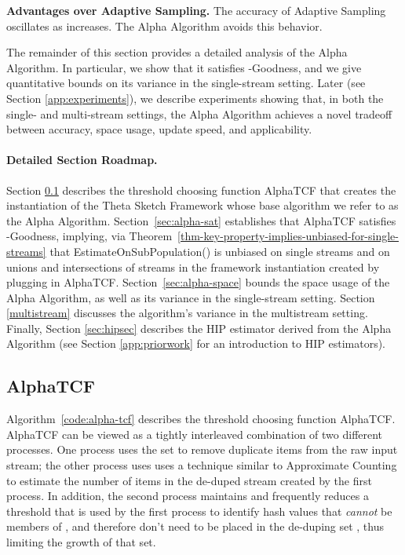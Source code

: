 \documentclass{article}
\newcommand{\edit}[1]{{#1}}
\begin{document}
\medskip
\noindent \textbf{Advantages over Adaptive Sampling.} The accuracy of Adaptive Sampling oscillates as  increases. The Alpha Algorithm avoids this
behavior. 

\medskip
The remainder of this section provides a detailed analysis of the Alpha Algorithm. In particular, we show that it satisfies -Goodness, and 
we give quantitative bounds on its variance in the single-stream setting. 
Later (see Section \ref{app:experiments}), we describe experiments showing that, in both the single- and multi-stream settings, the Alpha Algorithm
achieves a novel tradeoff between accuracy, space usage, update speed, and applicability. 

\paragraph{Detailed Section Roadmap.} Section \ref{sec:alpha-tcf} describes the 
threshold choosing function AlphaTCF that creates the instantiation
of the Theta Sketch Framework whose base algorithm we refer to as the Alpha Algorithm.
Section~\ref{sec:alpha-sat} establishes that AlphaTCF satisfies -Goodness, implying, via 
Theorem~\ref{thm-key-property-implies-unbiased-for-single-streams}
that EstimateOnSubPopulation() is unbiased on single streams and on unions and intersections of streams in the framework
instantiation created by plugging in AlphaTCF.
 Section~\ref{sec:alpha-space} bounds the space usage of the Alpha Algorithm, as well as its variance in
 the single-stream setting. Section \ref{multistream} discusses
the algorithm's variance in the multistream setting. Finally, 
Section \ref{sec:hipsec} describes the HIP estimator derived from the Alpha Algorithm (see Section \ref{app:priorwork} for an introduction to HIP estimators).


\label{app:alpha}

\subsection{AlphaTCF}\label{sec:alpha-tcf}

Algorithm~\ref{code:alpha-tcf} describes the threshold choosing function AlphaTCF. AlphaTCF can be
viewed as a tightly interleaved combination of two different processes. One process uses the set  to remove
duplicate items from the raw input stream; the other process uses \edit{uses a technique similar to} Approximate Counting \cite{morris1978counting}
to estimate the number of items in the de-duped stream created by the first process. In addition, the second
process maintains and frequently reduces a threshold  that is used by the first process to identify 
hash values that {\em cannot} be members of , and therefore don't need to be placed in the de-duping set ,
thus limiting the growth of that set.
\end{document}
